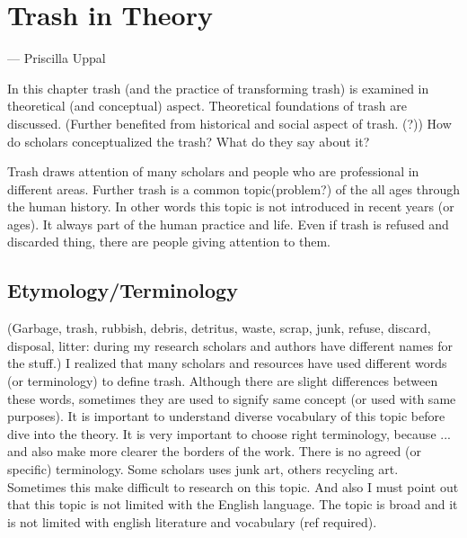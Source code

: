 \chapter{Trash in Theory}

\epigraph{\textit{}}{\hfill --- Priscilla Uppal}

In this chapter trash (and the practice of transforming trash) is examined in theoretical (and conceptual) aspect. Theoretical foundations of trash are discussed. (Further benefited from historical and social aspect of trash. (?)) How do scholars conceptualized the trash? What do they say about it? 

Trash draws attention of many scholars and people who are professional in different areas. Further trash is a common topic(problem?) of the all ages through the human history. In other words this topic is not introduced in recent years (or ages). It always part of the human practice and life. Even if trash is refused and discarded thing, there are people giving attention to them.

\section{Etymology/Terminology}
(Garbage, trash, rubbish, debris, detritus, waste, scrap, junk, refuse, discard, disposal, litter: during my research scholars and authors have different names for the stuff.) I realized that many scholars and resources have used different words (or terminology) to define trash. Although there are slight differences between these words, sometimes they are used to signify same concept (or used with same purposes). It is important to understand diverse vocabulary of this topic before dive into the theory. It is very important to choose right terminology, because ... and also make more clearer the borders of the work. There is no agreed (or specific) terminology. Some scholars uses junk art, others recycling art. Sometimes this make difficult to research on this topic. And also I must point out that this topic is not limited with the English language. The topic is broad and it is not limited with english literature and vocabulary (ref required). 

